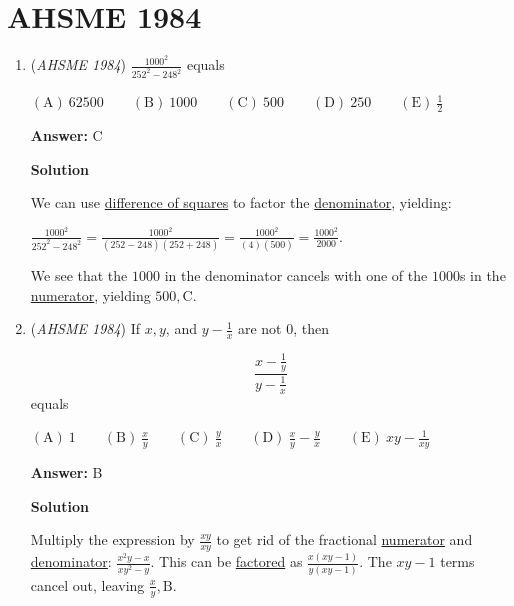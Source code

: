 \section{AHSME 1984}
        \begin{enumerate}
        	\item (\textit{AHSME 1984}) $\frac{1000^2}{252^2-248^2}$ equals


 $\mathrm{(A) \  }62500 \qquad \mathrm{(B) \  }1000 \qquad \mathrm{(C) \  } 500\qquad \mathrm{(D) \  }250 \qquad \mathrm{(E) \  } \frac{1}{2}$

 \textbf{Answer: }C



\textbf{Solution}

We can use \href{https://artofproblemsolving.com/wiki/index.php?title=Difference\_of\_squares}{difference of squares} to factor the \href{https://artofproblemsolving.com/wiki/index.php?title=Denominator}{denominator}, yielding:

 $\frac{1000^2}{252^2-248^2}=\frac{1000^2}{(252-248)(252+248)}=\frac{1000^2}{(4)(500)}=\frac{1000^2}{2000}$.

 We see that the $1000$ in the denominator cancels with one of the $1000$s in the \href{https://artofproblemsolving.com/wiki/index.php?title=Numerator}{numerator}, yielding $500, \boxed{\text{C}}$.

 


	\item (\textit{AHSME 1984}) If $x, y$, and $y-\frac{1}{x}$ are not $0$, then


 
 \[\frac{x-\frac{1}{y}}{y-\frac{1}{x}}\] 
equals


 $\mathrm{(A) \ }1 \qquad \mathrm{(B) \ }\frac{x}{y} \qquad \mathrm{(C) \ } \frac{y}{x}\qquad \mathrm{(D) \ }\frac{x}{y}-\frac{y}{x} \qquad \mathrm{(E) \ } xy-\frac{1}{xy}$

 \textbf{Answer: }B



\textbf{Solution}

Multiply the expression by $\frac{xy}{xy}$ to get rid of the fractional \href{https://artofproblemsolving.com/wiki/index.php?title=Numerator}{numerator} and \href{https://artofproblemsolving.com/wiki/index.php?title=Denominator}{denominator}: $\frac{x^2y-x}{xy^2-y}$. This can be \href{https://artofproblemsolving.com/wiki/index.php?title=Factoring}{factored} as $\frac{x(xy-1)}{y(xy-1)}$. The $xy-1$ terms cancel out, leaving $\frac{x}{y}, \boxed{\text{B}}$.


\end{enumerate}
